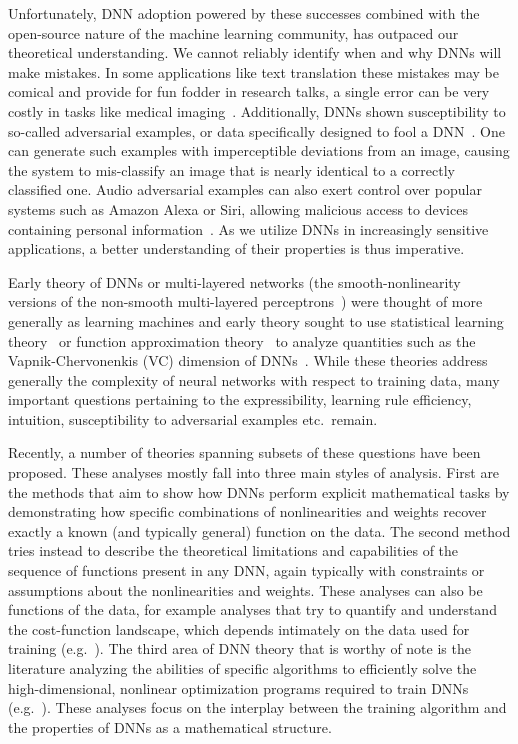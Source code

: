 \documentclass[11pt,lettersize]{article}
\begin{document}
Unfortunately, DNN adoption powered by these successes combined with the open-source nature of the machine learning community, has outpaced our theoretical understanding. We cannot reliably identify when and why DNNs will make mistakes. In some applications like text translation these mistakes may be comical and provide for fun fodder in research talks, a single error can be very costly in tasks like medical imaging~\cite{finlayson2018adversarial}. 
Additionally, DNNs shown susceptibility to so-called adversarial examples, or data specifically designed to fool a DNN~\cite{szegedy2013intriguing,nguyen2015deep,moosavi2016deepfool,brown2017adversarial}. One can generate such examples with imperceptible deviations from an image, causing the system to mis-classify an image that is nearly identical to a correctly classified one. Audio adversarial examples can also exert control over popular systems such as Amazon Alexa or Siri, allowing malicious access to devices containing personal information~\cite{carlini2018audio,zhang2017dolphinattack}. As we utilize DNNs in increasingly sensitive applications, a better understanding of their properties is thus imperative. 

Early theory of DNNs or multi-layered networks (the smooth-nonlinearity versions of the non-smooth multi-layered perceptrons~\cite{minsky1990perceptrons}) were thought of more generally as learning machines and early theory sought to use statistical learning theory~\cite{valiant1984theory,vapnik1998statistical,cucker2002mathematical} or function approximation theory~\cite{hornik1991approximation} to analyze quantities such as the Vapnik-Chervonenkis (VC) dimension of DNNs~\cite{vapnik1994measuring}. While these theories address generally the complexity of neural networks with respect to training data, many important questions pertaining to the expressibility, learning rule efficiency, intuition, susceptibility to adversarial examples etc.\ remain. 

Recently, a number of theories spanning subsets of these questions have been proposed. These analyses mostly fall into three main styles of analysis. First are the methods that aim to show how DNNs perform explicit mathematical tasks by demonstrating how specific combinations of nonlinearities and weights recover exactly a known (and typically general) function on the data. The second method tries instead to describe the theoretical limitations and capabilities of the sequence of functions present in any DNN, again typically with constraints or assumptions about the nonlinearities and weights. These analyses can also be functions of the data, for example analyses that try to quantify and understand the cost-function landscape, which depends intimately on the data used for training (e.g.~\cite{ballard2017energy,mhaskar2018analysis}). The third area of DNN theory that is worthy of note is the literature analyzing the abilities of specific algorithms to efficiently solve the high-dimensional, nonlinear optimization programs required to train DNNs (e.g.~\cite{wilson2017marginal,zhang2018theory}). These analyses focus on the interplay between the training algorithm and the properties of DNNs as a mathematical structure. 
\end{document}
